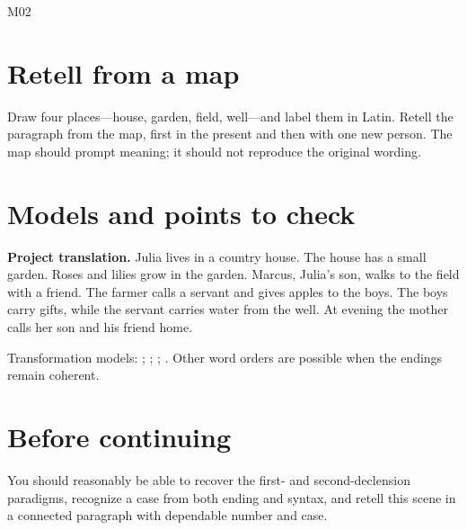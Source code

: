 \begin{courseunit}{M02}
\section{Retell from a map}

Draw four places---house, garden, field, well---and label them in Latin.  Retell
the paragraph from the map, first in the present and then with one new person.
The map should prompt meaning; it should not reproduce the original wording.

\ifsolutions
\section{Models and points to check}

\textbf{Project translation.} Julia lives in a country house. The house has a
small garden. Roses and lilies grow in the garden. Marcus, Julia's son, walks
to the field with a friend. The farmer calls a servant and gives apples to the
boys. The boys carry gifts, while the servant carries water from the well. At
evening the mother calls her son and his friend home.

Transformation models: ; ;
; .  Other word orders are possible when the endings remain coherent.
\else
\section{Before continuing}

You should reasonably be able to recover the first- and second-declension
paradigms, recognize a case from both ending and syntax, and retell this scene
in a connected paragraph with dependable number and case.
\fi
\end{courseunit}

